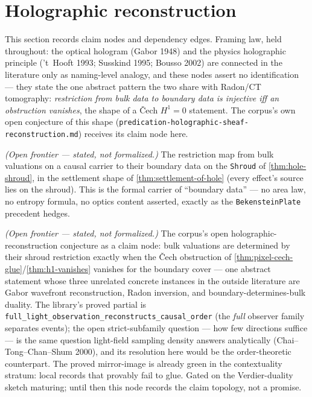 \section{Holographic reconstruction}

This section records claim nodes and dependency edges. Framing law, held throughout: the
optical hologram (Gabor 1948) and the physics holographic principle ('t~Hooft 1993;
Susskind 1995; Bousso 2002) are connected in the literature only as naming-level analogy,
and these nodes assert no identification --- they state the one abstract pattern the two
share with Radon/CT tomography: \emph{restriction from bulk data to boundary data is
injective iff an obstruction vanishes}, the shape of a \v{C}ech $H^{1} = 0$ statement.
The corpus's own open conjecture of this shape
(\texttt{predication-holographic-sheaf-reconstruction.md}) receives its claim node here.

\begin{proposition}\label{thm:shroud-restriction}\notready{}
\emph{(Open frontier --- stated, not formalized.)} The restriction map from bulk
valuations on a causal carrier to their boundary data on the \texttt{Shroud} of
\cref{thm:hole-shroud}, in the settlement shape of \cref{thm:settlement-of-hole} (every
effect's source lies on the shroud). This is the formal carrier of ``boundary data'' ---
no area law, no entropy formula, no optics content asserted, exactly as the
\texttt{BekensteinPlate} precedent hedges.
\end{proposition}

\begin{theorem}\label{thm:holographic-reconstruction-obstruction}\notready{}
\emph{(Open frontier --- stated, not formalized.)} The corpus's open
holographic-reconstruction conjecture as a claim node: bulk valuations are determined by
their shroud restriction exactly when the \v{C}ech obstruction of
\cref{thm:pixel-cech-glue}/\cref{thm:h1-vanishes} vanishes for the boundary cover ---
one abstract statement whose three unrelated concrete instances in the outside
literature are Gabor wavefront reconstruction, Radon inversion, and boundary-determines-bulk
duality. The library's proved partial is
\texttt{full\_light\_observation\_reconstructs\_causal\_order} (the \emph{full} observer
family separates events); the open strict-subfamily question --- how few directions
suffice --- is the same question light-field sampling density answers analytically
(Chai--Tong--Chan--Shum 2000), and its resolution here would be the order-theoretic
counterpart. The proved mirror-image is already green in the contextuality stratum: local
records that provably fail to glue. Gated on the Verdier-duality sketch maturing; until
then this node records the claim topology, not a promise.
\end{theorem}
